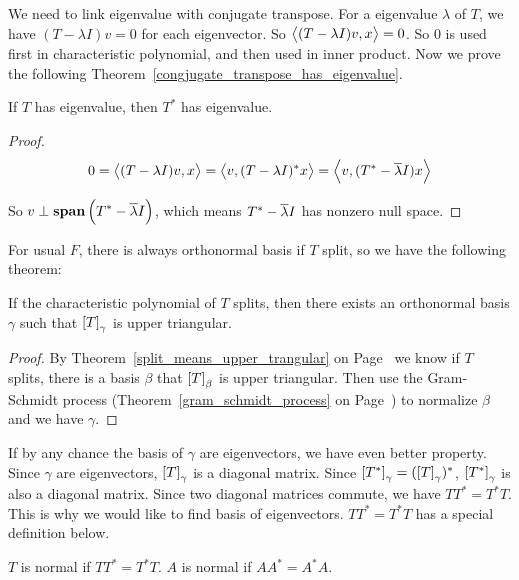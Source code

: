 We need to link eigenvalue with conjugate transpose. For a eigenvalue $\lambda$ of $T$, we have $(T - \lambda I)v = 0$ for each eigenvector. So $\left\langle \displaystyle (T-\lambda I)v, x \right\rangle = 0$. So $0$ is used first in characteristic polynomial, and then used in inner product. Now we prove the following Theorem~\ref{congjugate_transpose_has_eigenvalue}.

\begin{theorem}\label{congjugate_transpose_has_eigenvalue}
    If $T$ has eigenvalue, then $T^*$ has eigenvalue.    
\end{theorem}
\begin{proof}
    \begin{equation*}
        0 = \left\langle \displaystyle (T-\lambda I)v, x \right\rangle = \left\langle \displaystyle v, (T-\lambda I)^* x \right\rangle = \left\langle \displaystyle v, (T^* - \overline{\lambda}I) x \right\rangle
    \end{equation*}
    
    So $v \perp \displaystyle \mathbf{span}\left( T^* - \overline{\lambda}I \right)$, which means $T^* - \overline{\lambda}I$ has nonzero null space.
\end{proof}


For usual $F$, there is always orthonormal basis if $T$ split, so we have the following theorem:
\begin{theorem}[Schur]\label{schur_theorem}
    If the characteristic polynomial of $T$ splits, then there exists an orthonormal basis $\gamma$ such that $\coordinate{T}_\gamma$ is upper triangular.
\end{theorem}
\begin{proof}
    By Theorem~\ref{split_means_upper_trangular} on Page~\pageref{split_means_upper_trangular} we know if $T$ splits, there is a basis $\beta$ that $\coordinate{T}_\beta$ is upper triangular. Then use the Gram-Schmidt process (Theorem~\ref{gram_schmidt_process} on Page~\pageref{gram_schmidt_process}) to normalize $\beta$ and we have $\gamma$.
\end{proof}

If by any chance the basis of $\gamma$ are eigenvectors, we have even better property. Since $\gamma$ are eigenvectors, $\coordinate{T}_\gamma$ is a diagonal matrix. Since $\coordinate{T^*}_\gamma = (\coordinate{T}_\gamma)^*$, $\coordinate{T^*}_\gamma$ is also a diagonal matrix. Since two diagonal matrices commute, we have $TT^* = T^* T$. This is why we would like to find basis of eigenvectors. $TT^* = T^* T$ has a special definition below.

\begin{definition}[Normal]
    $T$ is normal if $TT^* = T^* T$. $A$ is normal if $AA^* = A^* A$.
\end{definition}

